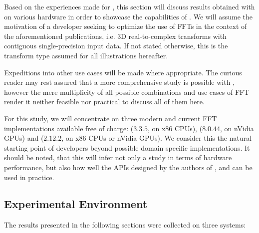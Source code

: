 Based on the experiences made for \cite{preibisch2014efficient, schmid2015real}, this section will discuss results obtained with \gearshifft{} on various hardware in order to showcase the capabilities of \gearshifft{}. We will assume the motivation of a developer seeking to optimize the use of FFTs in the context of the aforementioned publications, i.e. 3D real-to-complex transforms with contiguous single-precision input data. If not stated otherwise, this is the transform type assumed for all illustrations hereafter. 

Expeditions into other use cases will be made where appropriate. The curious reader may rest assured that a more comprehensive study is possible with \gearshifft{}, however the mere multiplicity of all possible combinations and use cases of FFT render it neither feasible nor practical to discuss all of them here.

For this study, we will concentrate on three modern and current FFT implementations available free of charge: \fftw{} ($3.3.5$, on x86 CPUs), \cufft{} ($8.0.44$, on nVidia GPUs) and \clfft{} ($2.12.2$, on x86 CPUs or nVidia GPUs). We consider this the natural starting point of developers beyond possible domain specific implementations. It should be noted, that this will infer not only a study in terms of hardware performance, but also how well the APIs designed by the authors of \fftw{}, \clfft{} and \cufft{} can be used in practice. 

\subsection{Experimental Environment}
\label{ssec:env}

The results presented in the following sections were collected on three systems:

